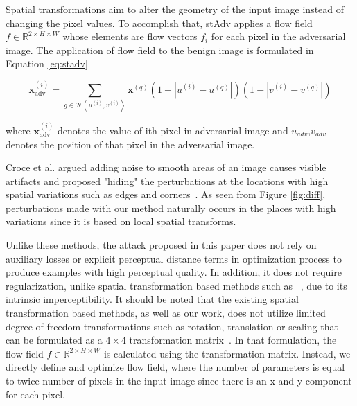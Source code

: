 Spatial transformations aim to alter the geometry of the input image instead of changing the pixel values. To accomplish that, stAdv applies a flow field \(f \in \mathbb{R}^{2\times H \times W}\) whose elements are flow vectors \(f_i\) for each pixel in the adversarial image. The application of flow field to the benign image is formulated in Equation \ref{eq:stadv}

\begin{equation}
    \label{eq:stadv}
    \mathbf{x}_{\mathrm{adv}}^{(i)}=\sum_{g \in \mathcal{N}\left(u^{(i)}, v^{(i)}\right\rangle} \mathbf{x}^{(q)}\left(1-\left|u^{(i)}-u^{(q)}\right|\right)\left(1-\left|v^{(i)}-v^{(q)}\right|\right)
\end{equation}

where \(\mathbf{x}_{\mathrm{adv}}^{(i)}\) denotes the value of ith pixel in adversarial image and \(u_{adv}\),\(v_{adv}\) denotes the position of that pixel in the adversarial image.


Croce et al. argued adding noise to smooth areas of an image causes visible artifacts and proposed "hiding" the perturbations at the locations with high spatial variations such as edges and corners~\cite{croce2019sparse}. As seen from Figure \ref{fig:diff}, perturbations made with our method naturally occurs in the places with high variations since it is based on local spatial transforms.



Unlike these methods, the attack proposed in this paper does not rely on auxiliary losses or explicit perceptual distance terms in optimization process to produce examples with high perceptual quality. In addition, it does not require regularization, unlike spatial transformation based methods such as ~\cite{xiao2018spatially}, due to its intrinsic imperceptibility. It should be noted that the existing spatial transformation based methods, as well as our work, does not utilize limited degree of freedom transformations such as rotation, translation or scaling that can be formulated as a \(4\times4\) transformation matrix~\cite{jaderberg2015spatial}. In that formulation, the flow field \(f \in \mathbb{R}^{2\times H \times W}\) is calculated using the transformation matrix. Instead, we directly define and optimize flow field, where the number of parameters is equal to twice number of pixels in the input image since there is an x and y component for each pixel. 


